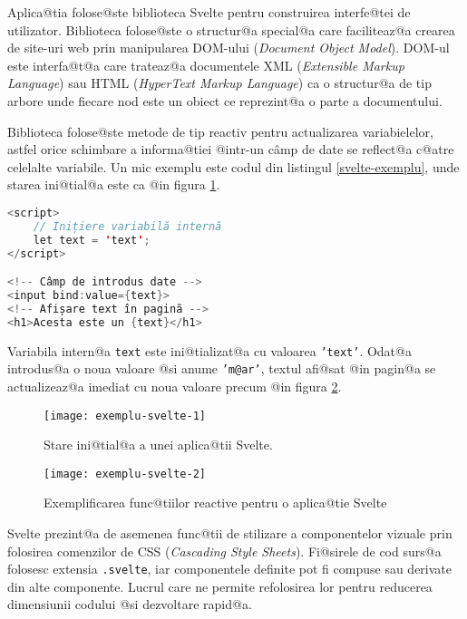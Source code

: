 Aplica@tia folose@ste biblioteca Svelte pentru construirea interfe@tei de utilizator. Biblioteca folose@ste o structur@a special@a care faciliteaz@a crearea de site-uri web prin manipularea DOM-ului (\textsl{Document Object Model}). DOM-ul este interfa@t@a care trateaz@a documentele XML (\textsl{Extensible Markup Language}) sau HTML (\textsl{HyperText Markup Language}) ca o structur@a de tip arbore unde fiecare nod este un obiect ce reprezint@a o parte a documentului.

Biblioteca folose@ste metode de tip reactiv pentru actualizarea variabielelor, astfel orice schimbare a informa@tiei @intr-un c\^ amp de date se reflect@a c@atre celelalte variabile. Un mic exemplu este codul din listingul \ref{svelte-exemplu}, unde starea ini@tial@a este ca @in figura \ref{fig:exemplu-svelte-1}.

\begin{lstlisting}[language=Java, caption={Exemplu de utilizare a bibliotecii Svelte}, label={svelte-exemplu}]
<script>
	// Inițiere variabilă internă
	let text = 'text'; 
</script>

<!-- Câmp de introdus date -->
<input bind:value={text}>
<!-- Afișare text în pagină -->
<h1>Acesta este un {text}</h1>
\end{lstlisting}

Variabila intern@a \texttt{text} este ini@tializat@a cu valoarea \texttt{'text'}. Odat@a introdus@a o noua valoare @si anume \texttt{'m@ar'}, textul afi@sat @in pagin@a se actualizeaz@a imediat cu noua valoare precum @in figura \ref{fig:exemplu-svelte-2}. 

\begin{figure}[h]
	\centering
	\texttt{[image: exemplu-svelte-1]}
	\caption{Stare ini@tial@a a unei aplica@tii Svelte.}
	\label{fig:exemplu-svelte-1}
\end{figure}

\begin{figure}[h]
	\centering
	\texttt{[image: exemplu-svelte-2]}
	\caption{Exemplificarea func@tiilor reactive pentru o aplica@tie Svelte}
	\label{fig:exemplu-svelte-2}
\end{figure}

Svelte prezint@a de asemenea func@tii de stilizare a componentelor vizuale prin folosirea comenzilor de CSS (\textsl{Cascading Style Sheets}). Fi@sirele de cod surs@a folosesc extensia \texttt{.svelte}, iar componentele definite pot fi compuse sau derivate din alte componente. Lucrul care ne permite refolosirea lor pentru reducerea dimensiunii codului @si dezvoltare rapid@a.

